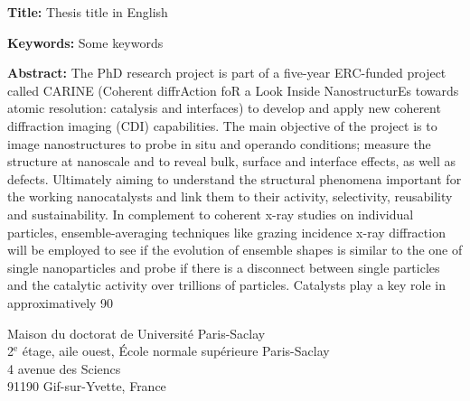 \documentclass[french,12pt,a4paper]{book}
\begin{document}
\begin{mdframed}[linecolor=Prune,linewidth=1]

\textbf{Title:} Thesis title in English

\noindent \textbf{Keywords:} Some keywords

\begin{multicols}{2}
\noindent \textbf{Abstract:} The PhD research project is part of a five-year ERC-funded project called CARINE (Coherent diffrAction foR a Look Inside NanostructurEs towards atomic resolution: catalysis and interfaces) to develop and apply new coherent diffraction imaging (CDI) capabilities. The main objective of the project is to image nanostructures to probe in situ and operando conditions; measure the structure at nanoscale and to reveal bulk, surface and interface effects, as well as defects. Ultimately aiming to understand the structural phenomena important for the working nanocatalysts and link them to their activity, selectivity, reusability and sustainability. In complement to coherent x-ray studies on individual particles, ensemble-averaging techniques like grazing incidence x-ray diffraction will be employed to see if the evolution of ensemble shapes is similar to the one of single nanoparticles and probe if there is a disconnect between single particles and the catalytic activity over trillions of particles. Catalysts play a key role in approximatively 90%
\end{multicols}
\end{mdframed}

\vspace{\fill} %

\noindent
\color{Prune} \footnotesize Maison du doctorat de Université Paris-Saclay\\
2$^{\mathrm{e}}$ étage, aile ouest, École normale supérieure Paris-Saclay\\
4 avenue des Sciencs\\
91190 Gif-sur-Yvette, France
\end{document}
